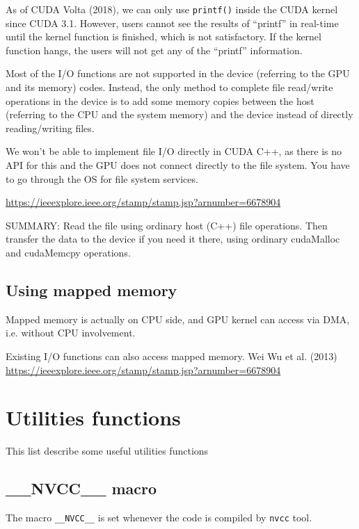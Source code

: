 As of CUDA Volta (2018), we can only use \verb!printf()! inside the CUDA kernel
since CUDA 3.1. However, users cannot see the results of “printf” in real-time
until the kernel function is finished, which is not satisfactory. If the kernel
function hangs, the users will not get any of the “printf” information.

Most of the I/O functions are not supported in the device (referring to the GPU
and its memory) codes. Instead, the only method to complete file read/write
operations in the device is to add some memory copies between the host
(referring to the CPU and the system memory) and the device instead of directly
reading/writing files.

We won't be able to implement file I/O directly in CUDA C++, as there is no API
for this and the GPU does not connect directly to the file system. You have to
go through the OS for file system services.

\url{https://ieeexplore.ieee.org/stamp/stamp.jsp?arnumber=6678904}


SUMMARY: Read the file using ordinary host (C++) file operations. Then transfer
the data to the device if you need it there, using ordinary cudaMalloc and
cudaMemcpy operations.

\subsection{Using mapped memory}

Mapped memory is actually on CPU side, and GPU kernel can access via DMA, i.e. without CPU involvement.

Existing I/O functions can also access mapped memory.
Wei Wu et al. (2013) \url{https://ieeexplore.ieee.org/stamp/stamp.jsp?arnumber=6678904}




\section{Utilities functions}

This list describe some useful utilities functions

\subsection{\_\_NVCC\_\_ macro}
\label{sec:__NVCC__-macro}

The macro \verb!__NVCC__! is set whenever the code is compiled by \verb!nvcc! tool. 

